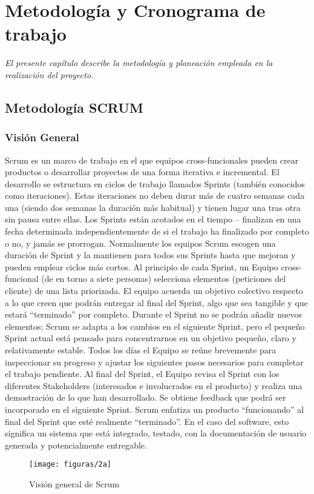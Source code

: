 \chapter{Metodología y Cronograma de trabajo}
\label{chap:metodologia}
\textit{El presente capítulo describe la metodología y planeación empleada en la realización del proyecto.}
\vfill
\minitoc
\cleardoublepage

\section{Metodología SCRUM}
\subsection{Visión General}
Scrum es un marco de trabajo en el que equipos cross-funcionales pueden crear productos o desarrollar proyectos de una forma iterativa e incremental. El desarrollo se estructura en ciclos de trabajo llamados Sprints (también conocidos como iteraciones). Estas iteraciones no deben durar más de cuatro semanas cada una (siendo dos semanas la duración más habitual) y tienen lugar una tras otra sin pausa entre ellas. Los Sprints están acotados en el tiempo – finalizan en una fecha determinada independientemente de si el trabajo ha finalizado por completo o no, y jamás se prorrogan. Normalmente los equipos Scrum escogen una duración de Sprint y la mantienen para todos sus Sprints hasta que mejoran y pueden emplear ciclos más cortos. Al principio de cada Sprint, un Equipo cross-funcional (de en torno a siete personas) selecciona elementos (peticiones del cliente) de una lista priorizada. El equipo acuerda un objetivo colectivo respecto a lo que creen que podrán entregar al final del Sprint, algo que sea tangible y que estará “terminado” por completo. Durante el Sprint no se podrán añadir nuevos elementos; Scrum se adapta a los cambios en el siguiente Sprint, pero el pequeño Sprint actual está pensado para concentrarnos en un objetivo pequeño, claro y relativamente estable. Todos los días el Equipo se reúne brevemente para inspeccionar su progreso y ajustar los siguientes pasos necesarios para completar el trabajo pendiente. Al final del Sprint, el Equipo revisa el Sprint con los diferentes Stakeholders (interesados e involucrados en el producto) y realiza una demostración de lo que han desarrollado. Se obtiene feedback que podrá ser incorporado en el siguiente Sprint. Scrum enfatiza un producto “funcionando” al final del Sprint que esté realmente “terminado”. En el caso del software, esto significa un sistema que está integrado, testado, con la documentación de usuario generada y potencialmente entregable. \cite{ref2}
  \begin{figure}[H]
  	\centering
  	\texttt{[image: figuras/2a]}
  	\captionsetup{width=.95\textwidth}
  	\caption{Visión general de Scrum \cite{ref2}}
  	\label{figura2a}
  \end{figure}

